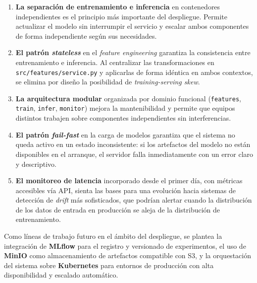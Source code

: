 \begin{enumerate}
    \item \textbf{La separación de entrenamiento e inferencia} en contenedores independientes es el principio más importante del despliegue. Permite actualizar el modelo sin interrumpir el servicio y escalar ambos componentes de forma independiente según sus necesidades.

    \item \textbf{El patrón \textit{stateless}} en el \textit{feature engineering} garantiza la consistencia entre entrenamiento e inferencia. Al centralizar las transformaciones en \texttt{src/features/service.py} y aplicarlas de forma idéntica en ambos contextos, se elimina por diseño la posibilidad de \textit{training-serving skew}.

    \item \textbf{La arquitectura modular} organizada por dominio funcional (\texttt{features}, \texttt{train}, \texttt{infer}, \texttt{monitor}) mejora la mantenibilidad y permite que equipos distintos trabajen sobre componentes independientes sin interferencias.

    \item \textbf{El patrón \textit{fail-fast}} en la carga de modelos garantiza que el sistema no queda activo en un estado inconsistente: si los artefactos del modelo no están disponibles en el arranque, el servidor falla inmediatamente con un error claro y descriptivo.

    \item \textbf{El monitoreo de latencia} incorporado desde el primer día, con métricas accesibles vía API, sienta las bases para una evolución hacia sistemas de detección de \textit{drift} más sofisticados, que podrían alertar cuando la distribución de los datos de entrada en producción se aleja de la distribución de entrenamiento.
\end{enumerate}

Como líneas de trabajo futuro en el ámbito del despliegue, se plantea la integración de \textbf{MLflow} para el registro y versionado de experimentos, el uso de \textbf{MinIO} como almacenamiento de artefactos compatible con S3, y la orquestación del sistema sobre \textbf{Kubernetes} para entornos de producción con alta disponibilidad y escalado automático.
